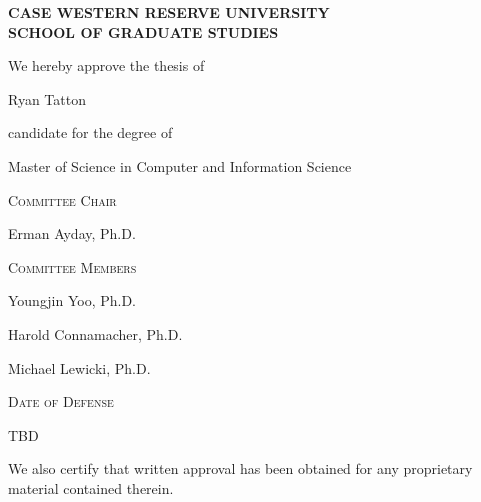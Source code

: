 \begin{center}
\large

\textbf{CASE WESTERN RESERVE UNIVERSITY \\ SCHOOL OF GRADUATE STUDIES}

\vspace{0.2in}

We hereby approve the thesis of

Ryan Tatton

candidate for the degree of

Master of Science in Computer and Information Science

\vspace{0.2in}

\textsc{Committee Chair}

Erman Ayday, Ph.D.

\vspace{0.2in}

\textsc{Committee Members}

Youngjin Yoo, Ph.D.

Harold Connamacher, Ph.D.

Michael Lewicki, Ph.D.

\vspace{0.2in}

\textsc{Date of Defense}

TBD %

\vspace{0.2in}

We also certify that written approval has been obtained for any proprietary
material contained therein.
\end{center}